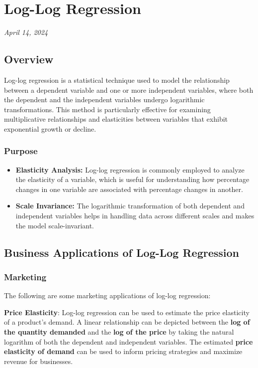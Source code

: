 \documentclass[
  letterpaper,
  DIV=11,
  numbers=noendperiod]{scrreport}
\author{}
\date{}
\providecommand{\tightlist}{%
  \setlength{\itemsep}{0pt}\setlength{\parskip}{0pt}}\usepackage{longtable,booktabs,array}
\begin{document}
\chapter{Log-Log Regression}\label{log-log-regression}

\emph{April 14, 2024}

\section{Overview}\label{overview}

Log-log regression is a statistical technique used to model the
relationship between a dependent variable and one or more independent
variables, where both the dependent and the independent variables
undergo logarithmic transformations. This method is particularly
effective for examining multiplicative relationships and elasticities
between variables that exhibit exponential growth or decline.

\subsection{Purpose}\label{purpose}

\begin{itemize}
\tightlist
\item
  \textbf{Elasticity Analysis:} Log-log regression is commonly employed
  to analyze the elasticity of a variable, which is useful for
  understanding how percentage changes in one variable are associated
  with percentage changes in another.
\item
  \textbf{Scale Invariance:} The logarithmic transformation of both
  dependent and independent variables helps in handling data across
  different scales and makes the model scale-invariant.
\end{itemize}

\section{Business Applications of Log-Log
Regression}\label{business-applications-of-log-log-regression}

\subsection{Marketing}\label{marketing}

The following are some marketing applications of log-log regression:

\textbf{Price Elasticity}: Log-log regression can be used to estimate
the price elasticity of a product's demand. A linear relationship can be
depicted between the \textbf{log of the quantity demanded} and the
\textbf{log of the price} by taking the natural logarithm of both the
dependent and independent variables. The estimated \textbf{price
elasticity of demand} can be used to inform pricing strategies and
maximize revenue for businesses.
\end{document}
